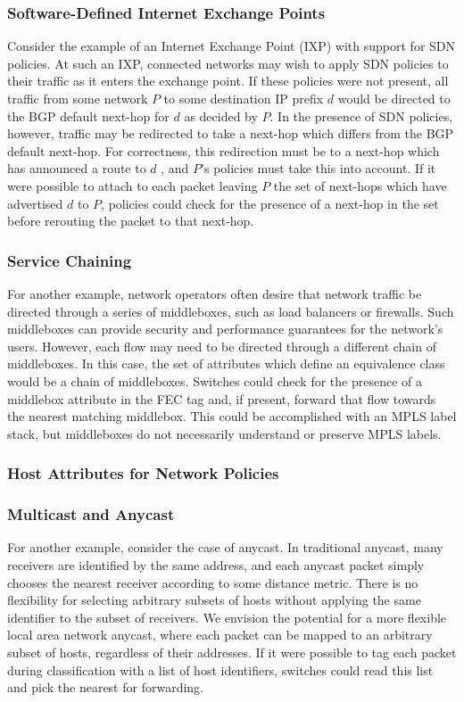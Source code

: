 \subsubsection{Software-Defined Internet Exchange Points}
Consider the example of an Internet Exchange Point (IXP) with support for SDN policies. At such an IXP, connected networks may wish to apply SDN policies to their traffic as it enters the exchange point. If these policies were not present, all traffic from some network $P$  to some destination IP prefix $d$ would be directed to the BGP default next-hop for $d$ as decided by $P$. In the presence of SDN policies, however, traffic may be redirected to take a next-hop which differs from the BGP default next-hop. For correctness, this redirection must be to a next-hop which has announced a route to $d$ , and $P$'s policies must take this into account. If it were possible to attach to each packet leaving $P$ the set of next-hops which have advertised $d$ to $P$, policies could check for the presence of a next-hop in the set before rerouting the packet to that next-hop. 

\subsubsection{Service Chaining}
For another example, network operators often desire that network traffic be directed through a series of middleboxes, such as load balancers or firewalls. Such middleboxes can provide security and performance guarantees for the network's users. However, each flow may need to be directed through a different chain of middleboxes. In this case, the set of attributes which define an equivalence class would be a chain of middleboxes. Switches could check for the presence of a middlebox attribute in the FEC tag and, if present, forward that flow towards the nearest matching middlebox. This could be accomplished with an MPLS label stack, but middleboxes do not necessarily understand or preserve MPLS labels. 

\subsubsection{Host Attributes for Network Policies}


\subsubsection{Multicast and Anycast}
For another example, consider the case of anycast. In traditional anycast, many receivers are identified by the same address, and each anycast packet simply chooses the nearest receiver according to some distance metric. There is no flexibility for selecting arbitrary subsets of hosts without applying the same identifier to the subset of receivers. We envision the potential for a more flexible local area network anycast, where each packet can be mapped to an arbitrary subset of hosts, regardless of their addresses. If it were possible to tag each packet during classification with a list of host identifiers, switches could read this list and pick the nearest for forwarding.
